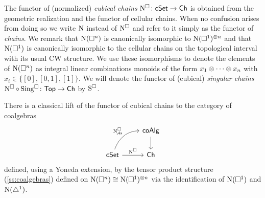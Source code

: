 The functor of (normalized) \textit{cubical chains} $\operatorname{N^{\square}} \colon \mathsf{cSet} \to \mathsf{Ch}$ is obtained from the geometric realization and the functor of cellular chains.
When no confusion arises from doing so we write $\operatorname{N}$ instead of $\operatorname{N^{\square}}$ and refer to it simply as the functor of \textit{chains}.
We remark that $\operatorname{N}(\square^n)$ is canonically isomorphic to $\operatorname{N}(\square^1)^{\otimes n}$ and that $\operatorname{N}(\square^1)$ is canonically isomorphic to the cellular chains on the topological interval with its usual CW structure.
We use these isomorphisms to denote the elements of $\operatorname{N}(\square^n)$ as integral linear combinations monoids of the form $x_1 \otimes\dotsb\otimes x_n$ with $x_i \in \big\{[0], [0,1], [1] \big\}$.
We will denote the functor of (cubical) \textit{singular chains} $\operatorname{N^{\square}} \circ \operatorname{Sing^{\square}} \colon \mathsf{Top} \to \mathsf{Ch}$ by $\operatorname{S^{\square}}$.

There is a classical lift of the functor of cubical chains to the category of coalgebras
\[
\begin{tikzcd}
	& \coAlg \arrow[d] \\
	\cSet \arrow[r, "\cchains"] \arrow[ur, "\cchainsA", out=70, in=180] & \Ch
\end{tikzcd}
\]
defined, using a Yoneda extension, by the tensor product structure (\cref{ss:coalgebras}) defined on $\operatorname{N}(\square^n) \cong \operatorname{N}(\square^1)^{\otimes n}$ via the identification of $\operatorname{N}(\square^1)$ and $\operatorname{N}(\triangle^1)$.

%
%


